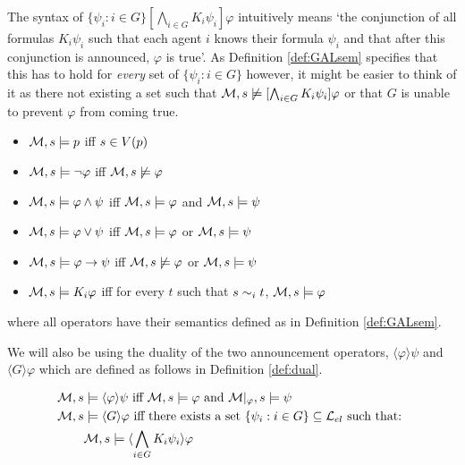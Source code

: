 The syntax of $\{\psi_i: i\in G\}[\bigwedge_{i\in G}K_i\psi_i]\varphi$ intuitively means `the conjunction of all formulas $K_i\psi_i$ such that each agent $i$ knows their formula $\psi_i$ and that after this conjunction is announced, $\varphi$ is true'. As Definition \ref{def:GALsem} specifies that this has to hold for \textit{every} set of $\{\psi_i : i\in G\}$ however, it might be easier to think of it as there not existing a set such that $\mathcal{M},s \not\models [\bigwedge_{i\in G}K_i\psi_i]\varphi$ or that $G$ is unable to prevent $\varphi$ from coming true.

\begin{definition} \hfill
	\label{def:langel}
	\begin{itemize}
		\item[] $\mathcal{M},s \models p $ iff $ s \in V(p)$
		\item[] $\mathcal{M},s \models \neg\varphi$ iff $ \mathcal{M},s \not\models \varphi$
		\item[] $\mathcal{M},s \models \varphi \wedge \psi $ iff $ \mathcal{M},s \models \varphi $ and $ \mathcal{M},s \models \psi$
		\item[] $\mathcal{M},s \models \varphi \vee \psi $ iff $ \mathcal{M},s \models \varphi $ or $ \mathcal{M},s \models \psi$
		\item[] $\mathcal{M},s \models \varphi \rightarrow \psi $ iff $ \mathcal{M},s \not\models \varphi $ or $ \mathcal{M},s \models \psi$
		\item[] $\mathcal{M},s \models K_i\varphi $ iff for every $t$ such that $s\sim_{i}t$, $\mathcal{M},s \models \varphi$
	\end{itemize}
	where all operators have their semantics defined as in Definition \ref{def:GALsem}.
\end{definition}

We will also be using the duality of the two announcement operators, $\langle\varphi\rangle\psi$ and $\langle G\rangle\varphi$ which are defined as follows in Definition \ref{def:dual}.

\begin{definition} \hfill
	\label{def:dual}
	\begin{align*}
		\mathcal{M},s &\models \langle\varphi\rangle\psi\textrm{ iff }\mathcal{M},s \models \varphi\textrm{ and }\mathcal{M}|_\varphi,s \models \psi \\
		\mathcal{M},s &\models \langle G\rangle\varphi \textrm{ iff there exists a set }\{\psi_i:i\in G\} \subseteq \textrm{$\mathcal{L}_{el}$ such that: }\\
			   &\mathcal{M},s \models \langle\bigwedge_{i\in G}K_i\psi_i\rangle\varphi
	\end{align*}

\end{definition}

